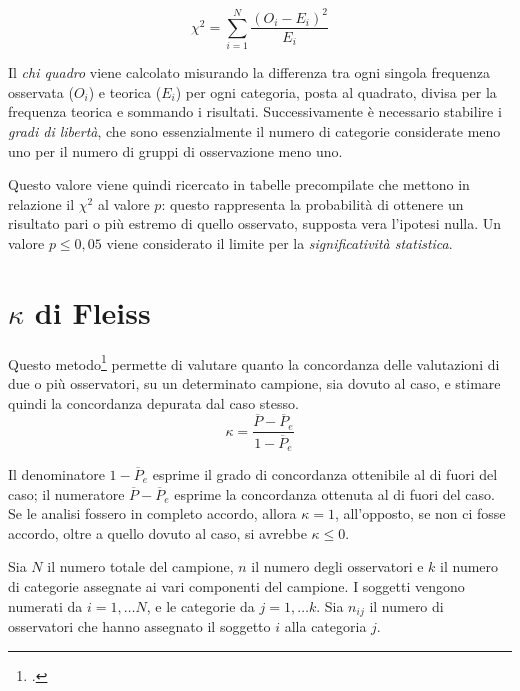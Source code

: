 \begin{equation}
\label{eq:chi_square}
\chi^2 = \sum_{i=1}^N \frac{{(O_i-E_i)}^2}{E_i}
\end{equation}

Il \emph{chi quadro} viene calcolato misurando la differenza tra ogni singola frequenza osservata ($O_i$) e teorica ($E_i$) per ogni categoria, posta al quadrato, divisa per la frequenza teorica e sommando i risultati. Successivamente è necessario stabilire i \emph{gradi di libertà}, che sono essenzialmente il numero di categorie considerate meno uno per il numero di gruppi di osservazione meno uno.

Questo valore viene quindi ricercato in tabelle precompilate che mettono in relazione il $\chi^2$ al valore $p$: questo rappresenta la probabilità di ottenere un risultato pari o più estremo di quello osservato, supposta vera l'ipotesi nulla. Un valore $p \le 0,05$ viene considerato il limite per la \emph{significatività statistica}.

\section{$\kappa$ di Fleiss}
Questo metodo\footcite{Fleiss1971} permette di valutare quanto la concordanza delle valutazioni di due o più osservatori, su un determinato campione, sia dovuto al caso, e stimare quindi la concordanza depurata dal caso stesso.
\begin{equation}
\label{eq:kappa_fleiss}
\kappa = \frac{\overline{P} - \overline{P}_e}{1 - \overline{P}_e}
\end{equation}

Il denominatore $1 - \overline{P}_e$ esprime il grado di concordanza ottenibile al di fuori del caso; il numeratore $\overline{P} - \overline{P}_e$ esprime la concordanza ottenuta al di fuori del caso. Se le analisi fossero in completo accordo, allora $\kappa = 1$, all'opposto, se non ci fosse accordo, oltre a quello dovuto al caso, si avrebbe $\kappa \leq 0$.

Sia $N$ il numero totale del campione, $n$ il numero degli osservatori e $k$ il numero di categorie assegnate ai vari componenti del campione. I soggetti vengono numerati da $i = 1, \ldots N$, e le categorie da $j = 1, \ldots k$. Sia $n_{ij}$ il numero di osservatori che hanno assegnato il soggetto $i$ alla categoria $j$.

